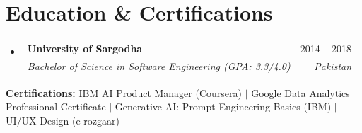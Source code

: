 \documentclass[letterpaper,10pt]{article}
\makeatletter
\newcommand{\resumeSubheading}[4]{
  \vspace{-2pt}\item
    \begin{tabular*}{0.97\textwidth}[t]{l@{\extracolsep{\fill}}r}
      \textbf{#1} & #2 \\
      \textit{\small#3} & \textit{\small #4} \\
    \end{tabular*}\vspace{-7pt}
}
\newcommand{\resumeSubHeadingListStart}{\begin{itemize}[leftmargin=0.15in, label={}]}
\newcommand{\resumeSubHeadingListEnd}{\end{itemize}}
\makeatother
\begin{document}
\section{Education \& Certifications}
  \resumeSubHeadingListStart
    \resumeSubheading
      {University of Sargodha}{2014 -- 2018}
      {Bachelor of Science in Software Engineering (GPA: 3.3/4.0)}{Pakistan}
  \resumeSubHeadingListEnd
  \vspace{-4pt}
  \begin{itemize}[leftmargin=0.15in, label={}]
    \small{\item{
     \textbf{Certifications:} IBM AI Product Manager (Coursera) $|$ Google Data Analytics Professional Certificate $|$ Generative AI: Prompt Engineering Basics (IBM) $|$ UI/UX Design (e-rozgaar)
    }}
  \end{itemize}
\end{document}
